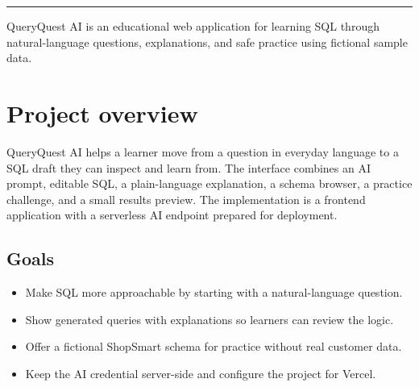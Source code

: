 \documentclass[11pt]{article}
\begin{document}
\begin{titlepage}\centering{}\vspace{0.18in}{\Huge\bfseries AI Database Assistant\par}\vspace{0.22in}{\large Project report and artifact guide\par}\vspace{0.55in}\rule{0.72\textwidth}{0.7pt}\par\vspace{0.3in}{\large React + Vite \quad $\cdot$ \quad Vercel-ready \quad $\cdot$ \quad OpenAI Responses API\par}\vfill\begin{minipage}{0.78\textwidth}\centering\color{muted}QueryQuest AI is an educational web application for learning SQL through natural-language questions, explanations, and safe practice using fictional sample data.\end{minipage}\vfill\end{titlepage}
\section{Project overview}
QueryQuest AI helps a learner move from a question in everyday language to a SQL draft they can inspect and learn from. The interface combines an AI prompt, editable SQL, a plain-language explanation, a schema browser, a practice challenge, and a small results preview. The implementation is a frontend application with a serverless AI endpoint prepared for deployment.
\subsection{Goals}
\begin{itemize}\item Make SQL more approachable by starting with a natural-language question.\item Show generated queries with explanations so learners can review the logic.\item Offer a fictional ShopSmart schema for practice without real customer data.\item Keep the AI credential server-side and configure the project for Vercel.\end{itemize}
\end{document}
